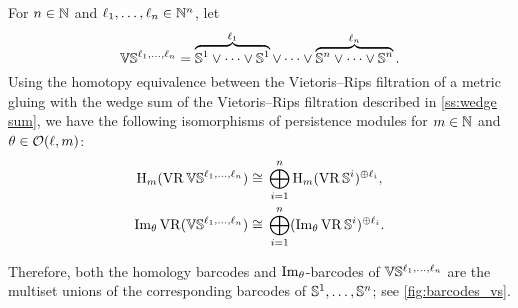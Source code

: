 



For $n \in \mathbb{N}$ and $\ell_1, \dots, \ell_n \in \mathbb{N}^n$, let
\[
\mathbb{V}\mathbb{S}^{\ell_1,\dots,\ell_n} =
\overbrace{\mathbb{S}^1\vee\dots\vee\mathbb{S}^1}^{\ell_1} \vee\dots\vee \overbrace{\mathbb{S}^n\vee\dots\vee\mathbb{S}^n}^{\ell_n}.
\]
Using the homotopy equivalence between the Vietoris--Rips filtration of a metric gluing with the wedge sum of the Vietoris--Rips filtration described in \cref{ss:wedge sum}, we have the following isomorphisms of persistence modules for \(m \in \mathbb{N}\) and \(\theta \in \mathcal{O}(\ell,m)\):
\[
\begin{split}
	\mathrm{H}_m (\operatorname{VR}\mathbb{V}\mathbb{S}^{\ell_1,\dots,\ell_n}) &\cong \, \bigoplus_{i=1}^n \mathrm{H}_m (\operatorname{VR}\mathbb{S}^i)^{\oplus \ell_i}, \\
	\operatorname{Im}_\theta \operatorname{VR}(\mathbb{V}\mathbb{S}^{\ell_1,\dots,\ell_n}) &\cong \, \bigoplus_{i=1}^n (\operatorname{Im}_\theta \operatorname{VR}\mathbb{S}^i)^{\oplus \ell_i}.
\end{split}
\]

Therefore, both the homology barcodes and \(\operatorname{Im}_\theta\)-barcodes of \(\mathbb{V}\mathbb{S}^{\ell_1, \dots, \ell_n}\) are the multiset unions of the corresponding barcodes of \(\mathbb{S}^1, \dots, \mathbb{S}^n\); see \cref{fig:barcodes_vs}.

